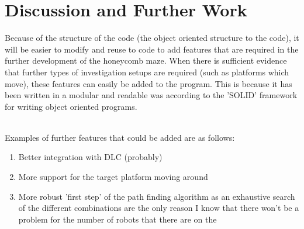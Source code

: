 \section{Discussion and Further Work}

Because of the structure of the code (the object oriented structure to the code), it will be easier to modify and reuse to code to add features that are required in the further development of the honeycomb maze. 
When there is sufficient evidence that further types of investigation setups are required (such as platforms which move), these features can easily be added to the program. This is because it has been written in a modular and readable was according to the 'SOLID' framework for writing object oriented programs.

\\
Examples of further features that could be added are as follows:

\begin{enumerate}
    \item Better integration with DLC (probably)
    \item More support for the target platform moving around 
    \item More robust 'first step' of the path finding algorithm as an exhaustive search of the different combinations are the only reason I know that there won't be a problem for the number of robots that there are on the 
\end{enumerate}